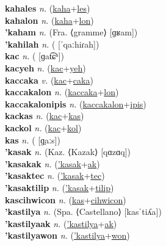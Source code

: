 \textbf{kahales} \textit{n.} (\hyperref[kaha]{kaha}+\hyperref[les]{les})
 \label{kahales} \\
\textbf{kahalon} \textit{n.} (\hyperref[kaha]{kaha}+\hyperref[lon]{lon})
 \label{kahalon} \\
\textbf{'kaham} \textit{n.} (Fra. ⟨gramme⟩ [ɡʁam])
 \label{'kaham} \\
\textbf{'kahilah} \textit{n.} ( [ˈqaːhiɾah])
 \label{'kahilah} \\
\textbf{kac} \textit{n.} ( [ɡat͡ɕʰ])
 \label{kac} \\
\textbf{kacyeh} \textit{n.} (\hyperref[kac]{kac}+\hyperref[yeh]{yeh})
 \label{kacyeh} \\
\textbf{kaccaka} \textit{v.} (\hyperref[kac]{kac}+\hyperref[caka]{caka})
 \label{kaccaka} \\
\textbf{kaccakalon} \textit{n.} (\hyperref[kaccaka]{kaccaka}+\hyperref[lon]{lon})
 \label{kaccakalon} \\
\textbf{kaccakalonipis} \textit{n.} (\hyperref[kaccakalon]{kaccakalon}+\hyperref[ipis]{ipis})
 \label{kaccakalonipis} \\
\textbf{kackas} \textit{n.} (\hyperref[kac]{kac}+\hyperref[kas]{kas})
 \label{kackas} \\
\textbf{kackol} \textit{n.} (\hyperref[kac]{kac}+\hyperref[kol]{kol})
 \label{kackol} \\
\textbf{kas} \textit{n.} ( [ɡ̤aːs])
 \label{kas} \\
\textbf{'kasak} \textit{n.} (Kaz. ⟨Kazak⟩ [qɑzɑq])
 \label{'kasak} \\
\textbf{'kasakak} \textit{n.} (\hyperref['kasak]{'kasak}+\hyperref[ak]{ak})
 \label{'kasakak} \\
\textbf{'kasaktec} \textit{n.} (\hyperref['kasak]{'kasak}+\hyperref[tec]{tec})
 \label{'kasaktec} \\
\textbf{'kasaktilip} \textit{n.} (\hyperref['kasak]{'kasak}+\hyperref[tilip]{tilip})
 \label{'kasaktilip} \\
\textbf{kascihwicon} \textit{n.} (\hyperref[kas]{kas}+\hyperref[cihwicon]{cihwicon})
 \label{kascihwicon} \\
\textbf{'kastilya} \textit{n.} (Spa. ⟨Castellano⟩ [kasˈtiʎa])
 \label{'kastilya} \\
\textbf{'kastilyaak} \textit{n.} (\hyperref['kastilya]{'kastilya}+\hyperref[ak]{ak})
 \label{'kastilyaak} \\
\textbf{'kastilyawon} \textit{n.} (\hyperref['kastilya]{'kastilya}+\hyperref[won]{won})
 \label{'kastilyawon} \\
